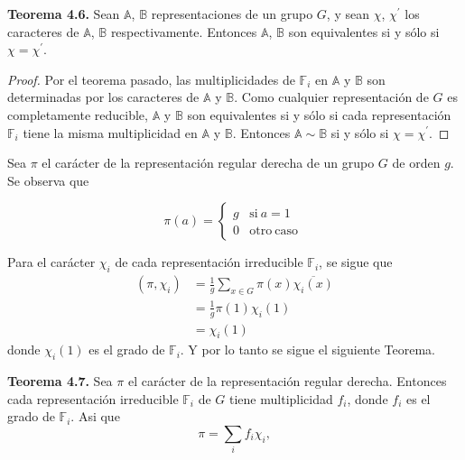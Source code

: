 \documentclass[12pt]{book}
\theoremstyle{definition}
\newcounter{in}
\begin{document}
\textbf{Teorema 4.6. } Sean $\mathbb{A}$, $\mathbb{B}$
representaciones de un grupo $G$, y sean $\chi$, $\chi^{'}$ los
caracteres de $\mathbb{A}$, $\mathbb{B}$ respectivamente. Entonces
$\mathbb{A}$, $\mathbb{B}$ son equivalentes si y sólo si
$\chi=\chi^{'}$.

\begin{proof}
  Por el teorema pasado, las multiplicidades de $\mathbb{F}_{i}$ en
  $\mathbb{A}$ y $\mathbb{B}$ son determinadas por los caracteres de
  $\mathbb{A}$ y $\mathbb{B}$. Como cualquier representación de $G$ es
  completamente reducible, $\mathbb{A}$ y $\mathbb{B}$ son
  equivalentes si y sólo si cada representación $\mathbb{F}_{i}$ tiene
  la misma multiplicidad en $\mathbb{A}$ y $\mathbb{B}$. Entonces
  $\mathbb{A} \sim \mathbb{B}$ si y sólo si $\chi=\chi^{'}$.
\end{proof}

Sea $\pi$ el carácter de la representación regular derecha de un grupo
$G$ de orden $g$. Se observa que

\begin{equation*} \label{PR}
         \pi(a) = \left\{
	       \begin{array}{ll}
		 g      & \mathrm{si\ } a = 1 \\
		 0      & \mathrm{otro\ caso\ } 
	       \end{array}
	     \right.
\end{equation*}

Para el carácter $\chi_{i}$ de cada representación irreducible
$\mathbb{F}_{i}$, se sigue que
\begin{equation*}
  \begin{aligned}
    (\pi,\chi_{i}) & =\frac{1}{g} \sum_{x \in G} \pi(x) \overline{\chi_{i}(x)} \\
    &=\frac{1}{g} \pi(1) \chi_{i}(1) \\
    &=\chi_{i}(1) 
  \end{aligned}
\end{equation*}
donde $\chi_{i}(1)$ es el grado de $\mathbb{F}_{i}$. Y por lo tanto se
sigue el siguiente Teorema.

\textbf{Teorema 4.7.} Sea $\pi$ el carácter de la representación
regular derecha. Entonces cada representación irreducible
$\mathbb{F}_{i}$ de $G$ tiene multiplicidad $f_{i}$, donde $f_{i}$ es
el grado de $\mathbb{F}_{i}$. Asi que
\begin{equation*}
  \pi=\sum_{i} f_{i} \chi_{i},
\end{equation*}
\end{document}
